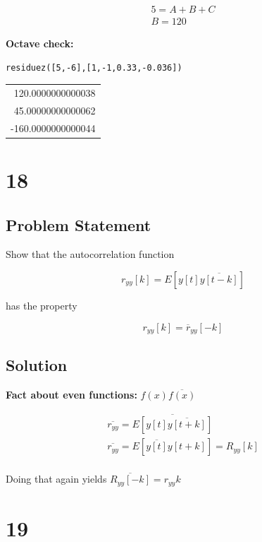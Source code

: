 \documentclass[11pt,a4paper,final]{article}
\begin{document}
\begin{equation*}
\begin{array}{c}
5 = A + B + C \\
B = 120
\end{array}
\end{equation*}

\textbf{\textbf{Octave check:}}

\begin{verbatim}
residuez([5,-6],[1,-1,0.33,-0.036])
\end{verbatim}

\begin{center}
\begin{tabular}{r}
120.0000000000038\\
45.00000000000062\\
-160.0000000000044\\
\end{tabular}
\end{center}
\section{18}
\label{sec:org1f76578}
\subsection{Problem Statement}
\label{sec:orgde48944}
Show that the autocorrelation function

$$
r_{yy}[k] = E[y[t] \overline{y[t-k]}]
$$

has the property

$$
r_{yy}[k] = \overline{r}_{yy}[-k]
$$

\subsection{Solution}
\label{sec:orgf3a857e}
\textbf{Fact about even functions:} \(f(x) \overline{f(x)}\)

\begin{equation*}
\begin{array}{c}
\overline{r_{yy}} = \overline{E[y[t]\overline{y[t+k]}]} \\
\overline{r_{yy}} = E[\overline{y[t]}y[t+k]] = R_{yy}[k] \\
\end{array}
\end{equation*}

Doing that again yields \(\overline{R_{yy}[-k]} = r_{yy}{k}\)

\section{19}
\label{sec:orgf251244}
\end{document}
